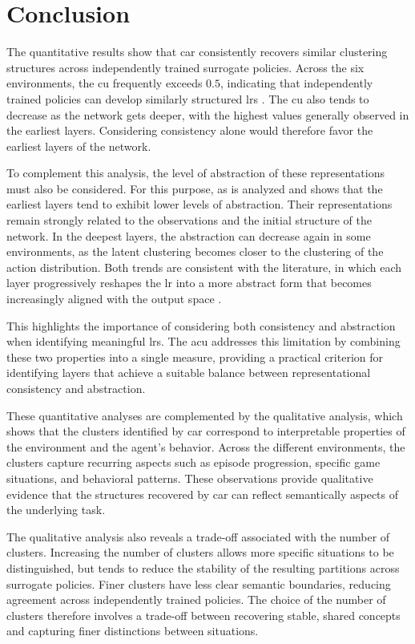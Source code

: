 \section{Conclusion}
\label{sec:experiments_conclusion}

The quantitative results show that \gls{car} consistently recovers similar clustering structures across independently trained surrogate policies.
Across the six environments, the \gls{cu} frequently exceeds $0.5$, indicating that independently trained policies can develop similarly structured \glspl{lr} \parencite{amezquita2020orchestrating}.
The \gls{cu} also tends to decrease as the network gets deeper, with the highest values generally observed in the earliest layers.
Considering consistency alone would therefore favor the earliest layers of the network.

To complement this analysis, the level of abstraction of these representations must also be considered.
For this purpose, \gls{as} is analyzed and shows that the earliest layers tend to exhibit lower levels of abstraction.
Their representations remain strongly related to the observations and the initial structure of the network.
In the deepest layers, the abstraction can decrease again in some environments, as the latent clustering becomes closer to the clustering of the action distribution.
Both trends are consistent with the literature, in which each layer progressively reshapes the \gls{lr} into a more abstract form that becomes increasingly aligned with the output space \parencite{rumelhart1986learning}.

This highlights the importance of considering both consistency and abstraction when identifying meaningful \glspl{lr}.
The \gls{acu} addresses this limitation by combining these two properties into a single measure, providing a practical criterion for identifying layers that achieve a suitable balance between representational consistency and abstraction.

These quantitative analyses are complemented by the qualitative analysis, which shows that the clusters identified by \gls{car} correspond to interpretable properties of the environment and the agent's behavior.
Across the different environments, the clusters capture recurring aspects such as episode progression, specific game situations, and behavioral patterns.
These observations provide qualitative evidence that the structures recovered by \gls{car} can reflect semantically aspects of the underlying task.

The qualitative analysis also reveals a trade-off associated with the number of clusters.
Increasing the number of clusters allows more specific situations to be distinguished, but tends to reduce the stability of the resulting partitions across surrogate policies.
Finer clusters have less clear semantic boundaries, reducing agreement across independently trained policies.
The choice of the number of clusters therefore involves a trade-off between recovering stable, shared concepts and capturing finer distinctions between situations.

